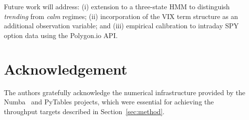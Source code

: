 \documentclass[conference]{IEEEtran}
\begin{document}
Future work will address: (i) extension to a three-state HMM to
distinguish \emph{trending} from \emph{calm} regimes; (ii)
incorporation of the VIX term structure as an additional observation
variable; and (iii) empirical calibration to intraday SPY option data
using the Polygon.io API.

\section*{Acknowledgement}

The authors gratefully acknowledge the numerical infrastructure
provided by the Numba~\cite{lam2015numba} and PyTables projects,
which were essential for achieving the throughput targets described
in Section~\ref{sec:method}.
\end{document}

